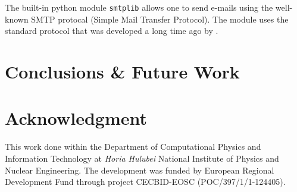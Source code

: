 \documentclass[conference]{IEEEtran}
\begin{document}
The built-in python module \texttt{smtplib} allows one to send e-mails using the well-known SMTP protocal (Simple Mail Transfer Protocol). The module uses the standard protocol that was developed a long time ago by \cite{postel1982rfc0821}.

\section{Conclusions \& Future Work}
\label{section-conclusions}


\section*{Acknowledgment}

This work done within the Department of Computational Physics and Information Technology at \emph{Horia Hulubei} National Institute of Physics and Nuclear Engineering. The development was funded by European Regional Development Fund through project CECBID-EOSC (POC/397/1/1-124405).



\end{document}
